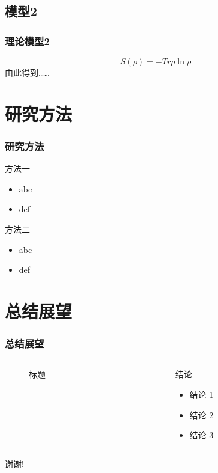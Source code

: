 \documentclass[12pt]{ctexbeamer}
\begin{document}
\subsection{模型2}
\begin{frame}
  \frametitle{理论模型2}
  \begin{equation*}
    S\left(\rho\right)=-Tr\rho\ln\rho
  \end{equation*}
  \pause
  由此得到……

\end{frame}


\section{研究方法}

\begin{frame}
  \frametitle{研究方法}
  \begin{block}{方法一}
    \begin{itemize}
      \item abc
      \item def
    \end{itemize}
  \end{block}
  \pause
  \begin{block}{方法二}
    \begin{itemize}
      \item abc
      \item def
    \end{itemize}
  \end{block}
\end{frame}


\section{总结展望}

\begin{frame}
  \frametitle{总结展望}
  \begin{columns}
    \begin{column}{0.50\textwidth}
      \begin{figure}
        \caption{标题}
      \end{figure}
    \end{column}
    \begin{column}{0.50\textwidth}
      \begin{block}{结论}
        \begin{itemize}
          \item 结论 1
          \item 结论 2
          \item 结论 3
        \end{itemize}
      \end{block}
    \end{column}
  \end{columns}
\end{frame}

\begin{frame}
  \centerline{\Large 谢谢!}
\end{frame}
\end{document}
